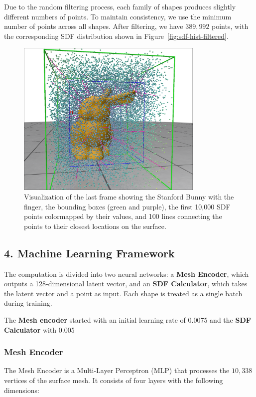 \documentclass[a4paper,12pt]{article}
\begin{document}
Due to the random filtering process, each family of shapes produces slightly different numbers of points. To maintain consistency, we use the minimum number of points across all shapes. After filtering, we have \( 389,992 \) points, with the corresponding SDF distribution shown in Figure~\ref{fig:sdf-hist-filtered}.

\begin{figure}[h!]
	\centering
	\includegraphics[width=0.8\textwidth]{proj/5-bbox-sdf-bunny.png}
	\caption{Visualization of the last frame showing the Stanford Bunny with the finger, the bounding boxes (green and purple), the first 10,000 SDF points colormapped by their values, and 100 lines connecting the points to their closest locations on the surface.}

	\label{fig:sdf-bbox}
\end{figure}

\subsection*{4. Machine Learning Framework}

The computation is divided into two neural networks: a \textbf{Mesh Encoder}, which outputs a 128-dimensional latent vector, and an \textbf{SDF Calculator}, which takes the latent vector and a point as input. Each shape is treated as a single batch during training.

The \textbf{Mesh encoder} started with an initial learning rate of 0.0075 and the \textbf{SDF Calculator} with 0.005
\subsubsection*{Mesh Encoder}
The Mesh Encoder is a Multi-Layer Perceptron (MLP) that processes the \( 10,338 \) vertices of the surface mesh. It consists of four layers with the following dimensions:
\end{document}
